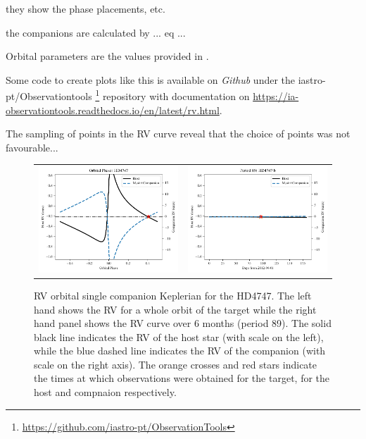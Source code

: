 they show the phase placements, etc.

the companions are calculated by ... eq ...

Orbital parameters are the values provided in .

Some code to create plots like this is available on \textit{Github} under the iastro-pt/Observationtools \footnote{\href{https://github.com/iastro-pt/ObservationTools}{https://github.com/iastro-pt/ObservationTools}} repository with documentation on \href{Read the Docs}{https://ia-observationtools.readthedocs.io/en/latest/rv.html}.



The sampling of points in the RV curve reveal that the choice of points was not favourable...


\begin{figure}
    \centering
    \begin{tabular}{cc}
    \includegraphics[width=0.45\linewidth]{figures/direct-recovery/orbital-plots/HD4747_orbital_phase.pdf}& \includegraphics[width=0.45\linewidth]{figures/direct-recovery/orbital-plots/HD4747_p89.pdf}\\
    \end{tabular}
    \caption{RV orbital single companion Keplerian for the HD4747. The left hand shows the RV for a whole orbit of the target while the right hand panel shows the RV curve over 6 months (period 89). The solid black line indicates the RV of the host star (with scale on the left), while the blue dashed line indicates the RV of the companion (with scale on the right axis).  The orange crosses and red stars indicate the times at which observations were obtained for the target, for the host and compnaion respectively.}
    \label{fig:hd4747p89}
\end{figure}

